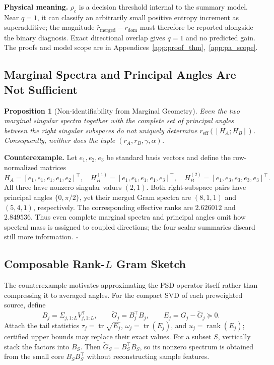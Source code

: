 \documentclass{article}
\newcommand{\reff}{\ensuremath{r_{\mathrm{eff}}}\xspace}
\newtheorem{proposition}[lemma]{Proposition}
\begin{document}
\textbf{Physical meaning.}
$\rho_c$ is a decision threshold internal to the summary model.  Near
$q=1$, it can classify an arbitrarily small positive entropy increment as
superadditive; the magnitude $\hat r_{\mathrm{merged}}-r_{\mathrm{dom}}$
must therefore be reported alongside the binary diagnosis.  Exact directional
overlap gives $q=1$ and no predicted gain.
The proofs and model scope are in
Appendices~\ref{app:proof_thm},~\ref{app:pa_scope}.

\subsection{Marginal Spectra and Principal Angles Are Not Sufficient}
\label{sec:insufficiency}

\begin{proposition}[Non-identifiability from Marginal Geometry]
\label{prop:insufficient}
Even the two marginal singular spectra together with the complete set of
principal angles between the right singular subspaces do not uniquely
determine $\reff([H_A;H_B])$.  Consequently, neither does the tuple
$(r_A,r_B,\gamma,\alpha)$.
\end{proposition}

\textbf{Counterexample.}
Let $e_1,e_2,e_3$ be standard basis vectors and define the row-normalized
matrices
\begin{equation}
 H_A=[e_1,e_1,e_1,e_1,e_2]^\top,\quad
 H_B^{(1)}=[e_1,e_1,e_1,e_1,e_3]^\top,\quad
 H_B^{(2)}=[e_1,e_3,e_3,e_3,e_3]^\top.
\end{equation}
All three have nonzero singular values $(2,1)$.  Both right-subspace pairs
have principal angles $\{0,\pi/2\}$, yet their merged Gram spectra are
$(8,1,1)$ and $(5,4,1)$, respectively.  The corresponding effective ranks
are $2.626012$ and $2.849536$.  Thus even complete marginal spectra and
principal angles omit how spectral mass is assigned to coupled directions;
the four scalar summaries discard still more information.
\hfill$\square$

\subsection{Composable Rank-$L$ Gram Sketch}
\label{sec:rank_l}

The counterexample motivates approximating the PSD operator itself rather
than compressing it to averaged angles.  For the compact SVD of each
preweighted source, define
\begin{equation}
 B_j=\Sigma_{j,1:L}V_{j,1:L}^{\top},\qquad
 \widetilde G_j=B_j^\top B_j,\qquad
 E_j=G_j-\widetilde G_j\succeq0 .
 \label{eq:rank_l_sketch}
\end{equation}
Attach the tail statistics
$\tau_j=\operatorname{tr}\sqrt{E_j}$,
$\omega_j=\operatorname{tr}(E_j)$, and
$u_j=\operatorname{rank}(E_j)$; certified upper bounds may replace their
exact values.  For a subset $S$, vertically stack the factors into $B_S$.
Then $\widetilde G_S=B_S^\top B_S$, so its nonzero spectrum is obtained
from the small core $B_SB_S^\top$ without reconstructing sample features.
\end{document}
